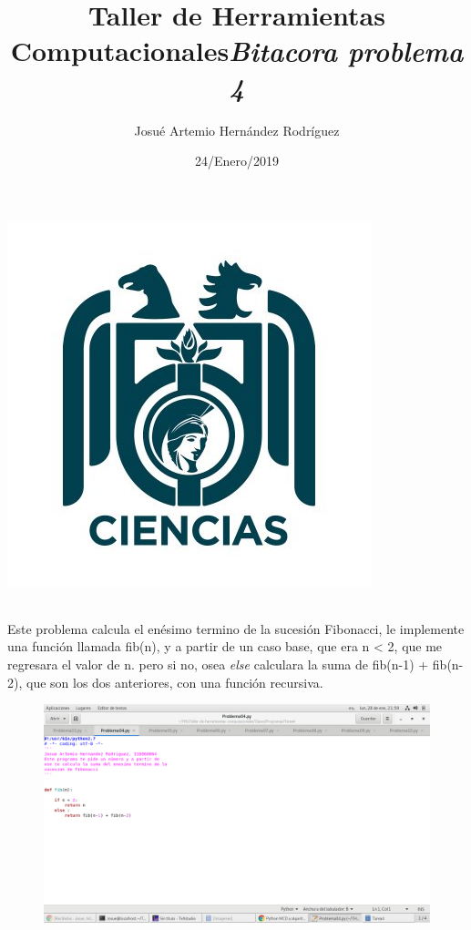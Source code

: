 \label{key}\documentclass[letterpaper, 12pt,oneside]{article}
\title{\Huge Taller de Herramientas Computacionales}
\author{Josué Artemio Hernández Rodríguez}
\date{24/Enero/2019}
\begin{document}
	\maketitle
	\begin{center}
		\includegraphics[scale=0.7]{3.jpg}
	\end{center}

	\newpage
	
	\title{\huge \textit{Bitacora problema 4 }}\\

	Este problema calcula el enésimo termino de la sucesión Fibonacci, le implemente una función llamada fib(n), y a partir de un caso base, que era n < 2, que me regresara el valor de n. pero si no, osea \textit{else} calculara la suma de fib(n-1) + fib(n-2), que son los dos anteriores, con una función recursiva. 
	
	 

	\begin{figure}[h]
		\includegraphics[scale=0.3]{pro04.png}
	\end{figure}
	
	
	
	
	
	
	
	
	
	
	
\end{document}
